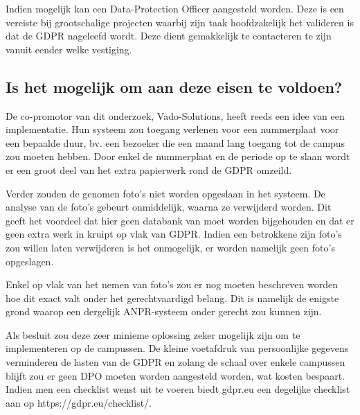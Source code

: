 Indien mogelijk kan een Data-Protection Officer aangesteld worden. Deze is een vereiste bij grootschalige projecten waarbij zijn taak hoofdzakelijk het valideren is dat de GDPR nageleefd wordt. Deze dient gemakkelijk te contacteren te zijn vanuit eender welke vestiging.

\subsection{Is het mogelijk om aan deze eisen te voldoen?}
De co-promotor van dit onderzoek, Vado-Solutions, heeft reeds een idee van een implementatie. Hun systeem zou toegang verlenen voor een nummerplaat voor een bepaalde duur, bv. een bezoeker die een maand lang toegang tot de campus zou moeten hebben. Door enkel de nummerplaat en de periode op te slaan wordt er een groot deel van het extra papierwerk rond de GDPR omzeild.

Verder zouden de genomen foto's niet worden opgeslaan in het systeem. De analyse van de foto's gebeurt onmiddelijk, waarna ze verwijderd worden. Dit geeft het voordeel dat hier geen databank van moet worden bijgehouden en dat er geen extra werk in kruipt op vlak van GDPR. Indien een betrokkene zijn foto's zou willen laten verwijderen is het onmogelijk, er worden namelijk geen foto's opgeslagen.

Enkel op vlak van het nemen van foto's zou er nog moeten beschreven worden hoe dit exact valt onder het gerechtvaardigd belang. Dit is namelijk de enigste grond waarop een dergelijk ANPR-systeem onder gerecht zou kunnen zijn.

Als besluit zou deze zeer minieme oplossing zeker mogelijk zijn om te implementeren op de campussen. De kleine voetafdruk van persoonlijke gegevens verminderen de lasten van de GDPR en zolang de schaal over enkele campussen blijft zou er geen DPO moeten worden aangesteld worden, wat kosten bespaart. Indien men een checklist wenst uit te voeren biedt gdpr.eu een degelijke checklist aan op https://gdpr.eu/checklist/.



